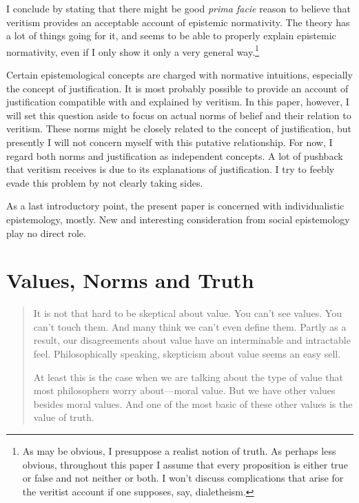 \documentclass[12pt,numbers=noenddot]{scrartcl}
\begin{document}
I conclude by stating that there might be good \emph{prima facie} reason to believe that veritism provides an acceptable account of epistemic normativity. The theory has a lot of things going for it, and seems to be able to properly explain epistemic normativity, even if I only show it only a very general way.\footnote{As may be obvious, I presuppose a realist notion of truth. As perhaps less obvious, throughout this paper I assume that every proposition is either true or false and not neither or both. I won't discuss complications that arise for the veritist account if one supposes, say, dialetheism.}

Certain epistemological concepts are charged with normative intuitions, especially the concept of justification. It is most probably possible to provide an account of justification compatible with and explained by veritism. In this paper, however, I will set this question aside to focus on actual norms of belief and their relation to veritism. These norms might be closely related to the concept of justification, but presently I will not concern myself with this putative relationship. For now, I regard both norms and justification as independent concepts. A lot of pushback that veritism receives is due to its explanations of justification. I try to feebly evade this problem by not clearly taking sides.

As a last introductory point, the present paper is concerned with individualistic epistemology, mostly. New and interesting consideration from social epistemology play no direct role.

\clearpage

\section{Values, Norms and Truth}\label{sec:values}

\begin{quote}
    It is not that hard to be skeptical about value. You can't see values. You can't touch them. And many think we can't even define them. Partly as a result, our disagreements about value have an interminable and intractable feel. Philosophically speaking, skepticism about value seems an easy sell.

    At least this is the case when we are talking about the type of value that most philosophers worry about—moral value. But we have other values besides moral values. And one of the most basic of these other values is the value of truth. \autocite[225]{Lynch2009}
\end{quote}
\end{document}
